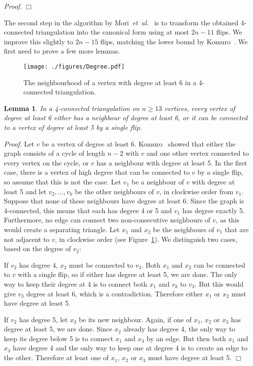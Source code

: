 \pdfoutput=1 \documentclass[12pt]{elsarticle}
\newtheorem{lem}[defin]{Lemma}
\newenvironment{lemma}{\begin{lem} \sl}{\end{lem}}
\newenvironment{proof}{\emph{Proof.}}{\hfill $\Box$ \medskip\\}
\newcommand{\etal}{\emph{et~al.}\xspace}
\begin{document}
\begin{proof}
\end{proof}

 \noindent The second step in the algorithm by Mori~\etal~\cite{mori2003diagonal} is to transform the obtained 4-connected triangulation into the canonical form using at most $2n - 11$ flips. We improve this slightly to $2n - 15$ flips, matching the lower bound by Komuro~\cite{komuro1997diagonal}. We first need to prove a few more lemmas.
 
\begin{figure}[ht]
 \centering
 \texttt{[image: ./figures/Degree.pdf]}
 \caption{The neighbourhood of a vertex with degree at least 6 in a 4-connected triangulation.}
 \label{fig:degree}
\end{figure}

\begin{lemma}
 \label{lem:degree}
 In a 4-connected triangulation on $n \geq 13$ vertices, every vertex of degree at least 6 either has a neighbour of degree at least 6, or it can be connected to a vertex of degree at least 5 by a single flip.
\end{lemma}
\begin{proof}
 Let $v$ be a vertex of degree at least 6. Komuro~\cite{komuro1997diagonal} showed that either the graph consists of a cycle of length $n - 2$ with $v$ and one other vertex connected to every vertex on the cycle, or $v$ has a neighbour with degree at least 5. In the first case, there is a vertex of high degree that can be connected to $v$ by a single flip, so assume that this is not the case. Let $v_1$ be a neighbour of $v$ with degree at least 5 and let $v_2, \dots, v_k$ be the other neighbours of $v$, in clockwise order from $v_1$. Suppose that none of these neighbours have degree at least 6. Since the graph is 4-connected, this means that each has degree 4 or 5 and $v_1$ has degree exactly 5. Furthermore, no edge can connect two non-consecutive neighbours of $v$, as this would create a separating triangle. Let $x_1$ and $x_2$ be the neighbours of $v_1$ that are not adjacent to $v$, in clockwise order (see Figure~\ref{fig:degree}). We distinguish two cases, based on the degree of $v_2$:
 
 If $v_2$ has degree 4, $x_2$ must be connected to $v_3$. Both $x_1$ and $x_2$ can be connected to $v$ with a single flip, so if either has degree at least 5, we are done. The only way to keep their degree at 4 is to connect both $x_1$ and $v_k$ to $v_3$. But this would give $v_3$ degree at least 6, which is a contradiction. Therefore either $x_1$ or $x_2$ must have degree at least 5.
 
 If $v_2$ has degree 5, let $x_3$ be its new neighbour. Again, if one of $x_1$, $x_2$ or $x_3$ has degree at least 5, we are done. Since $x_2$ already has degree 4, the only way to keep its degree below 5 is to connect $x_1$ and $x_3$ by an edge. But then both $x_1$ and $x_3$ have degree 4 and the only way to keep one at degree 4 is to create an edge to the other. Therefore at least one of $x_1$, $x_2$ or $x_3$ must have degree at least 5.
\end{proof}
\end{document}
